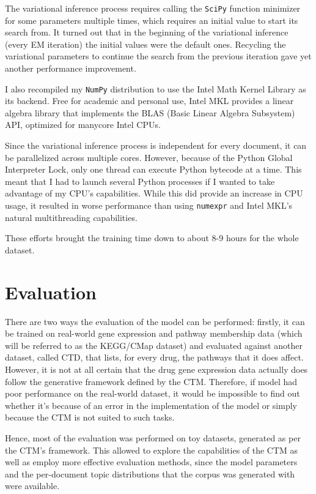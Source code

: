 \documentclass[12pt,a4paper,twoside,openright]{report}
\begin{document}
The variational inference process requires calling the \texttt{SciPy} function minimizer for some parameters multiple times, which requires an initial value to start its search from. It turned out that in the beginning of the variational inference (every EM iteration) the initial values were the default ones. Recycling the variational parameters to continue the search from the previous iteration gave yet another performance improvement.

I also recompiled my \texttt{NumPy} distribution to use the Intel Math Kernel Library as its backend. Free for academic and personal use, Intel MKL provides a linear algebra library that implements the BLAS (Basic Linear Algebra Subsystem) API, optimized for manycore Intel CPUs.

Since the variational inference process is independent for every document, it can be parallelized across multiple cores. However, because of the Python Global Interpreter Lock, only one thread can execute Python bytecode at a time. This meant that I had to launch several Python processes if I wanted to take advantage of my CPU's capabilities. While this did provide an increase in CPU usage, it resulted in worse performance than using \texttt{numexpr} and Intel MKL's natural multithreading capabilities.

These efforts brought the training time down to about 8-9 hours for the whole dataset.

\chapter{Evaluation}

There are two ways the evaluation of the model can be performed: firstly, it can be trained on real-world gene expression and pathway membership data (which will be referred to as the KEGG/CMap dataset) and evaluated against another dataset, called CTD, that lists, for every drug, the pathways that it does affect. However, it is not at all certain that the drug gene expression data actually does follow the generative framework defined by the CTM. Therefore, if model had poor performance on the real-world dataset, it would be impossible to find out whether it's because of an error in the implementation of the model or simply because the CTM is not suited to such tasks.

Hence, most of the evaluation was performed on toy datasets, generated as per the CTM's framework. This allowed to explore the capabilities of the CTM as well as employ more effective evaluation methods, since the model parameters and the per-document topic distributions that the corpus was generated with were available.
\end{document}
